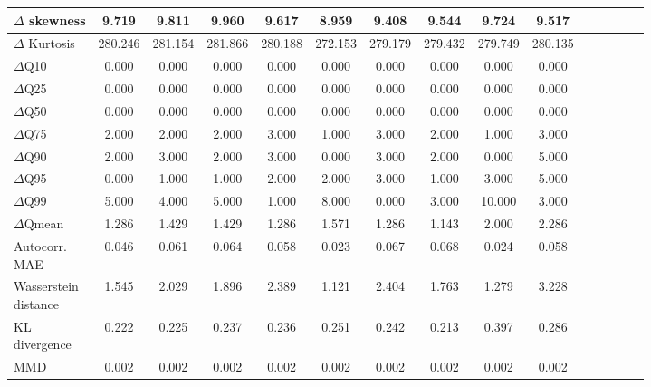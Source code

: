 \documentclass[make,article,submit,moreauthors]{Definitions/mdpi}
\begin{document}
\begin{table}[htbp]
\begin{tabular*}{\textwidth}{@{\extracolsep{\fill}}l|cccccccccccccc}
$\Delta$ skewness                   & 9.719   & 9.811   & 9.960   & 9.617   & 8.959   & 9.408   & 9.544   & 9.724   & 9.517           \\ \hline
$\Delta$ Kurtosis                   & 280.246 & 281.154 & 281.866 & 280.188 & 272.153 & 279.179 & 279.432 & 279.749 & 280.135         \\ \hline
$\Delta$Q10                         & 0.000   & 0.000   & 0.000   & 0.000   & 0.000   & 0.000   & 0.000   & 0.000   & 0.000           \\ \hline
$\Delta$Q25                         & 0.000   & 0.000   & 0.000   & 0.000   & 0.000   & 0.000   & 0.000   & 0.000   & 0.000           \\ \hline
$\Delta$Q50                         & 0.000   & 0.000   & 0.000   & 0.000   & 0.000   & 0.000   & 0.000   & 0.000   & 0.000           \\ \hline
$\Delta$Q75                         & 2.000   & 2.000   & 2.000   & 3.000   & 1.000   & 3.000   & 2.000   & 1.000   & 3.000           \\ \hline
$\Delta$Q90                         & 2.000   & 3.000   & 2.000   & 3.000   & 0.000   & 3.000   & 2.000   & 0.000   & 5.000           \\ \hline
$\Delta$Q95                         & 0.000   & 1.000   & 1.000   & 2.000   & 2.000   & 3.000   & 1.000   & 3.000   & 5.000           \\ \hline
$\Delta$Q99                         & 5.000   & 4.000   & 5.000   & 1.000   & 8.000   & 0.000   & 3.000   & 10.000  & 3.000           \\ \hline
$\Delta$Qmean                       & 1.286   & 1.429   & 1.429   & 1.286   & 1.571   & 1.286   & 1.143   & 2.000   & 2.286           \\ \hline
\shortstack{Autocorr.\\MAE}         & 0.046   & 0.061   & 0.064   & 0.058   & 0.023   & 0.067   & 0.068   & 0.024   & 0.058           \\ \hline
\shortstack{Wasserstein\\distance}  & 1.545   & 2.029   & 1.896   & 2.389   & 1.121   & 2.404   & 1.763   & 1.279   & 3.228           \\ \hline
\shortstack{KL\\divergence}         & 0.222   & 0.225   & 0.237   & 0.236   & 0.251   & 0.242   & 0.213   & 0.397   & 0.286           \\ \hline
MMD                                 & 0.002   & 0.002   & 0.002   & 0.002   & 0.002   & 0.002   & 0.002   & 0.002   & 0.002           \\ \hline

\end{tabular*}
\end{table}
\end{document}

